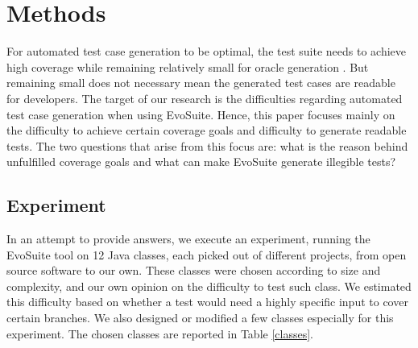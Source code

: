 \section{Methods} \label{methods}

For automated test case generation to be optimal, the test suite needs to achieve high coverage while remaining relatively small for oracle generation \cite{FRASER2013}.
But remaining small does not necessary mean the generated test cases are readable for developers.
The target of our research is the difficulties regarding automated test case generation when using EvoSuite. 
Hence, this paper focuses mainly on the difficulty to achieve certain coverage goals and difficulty to generate readable tests. 
The two questions that arise from this focus are: what is the reason behind unfulfilled coverage goals and what can make EvoSuite generate illegible tests?

\subsection{Experiment}

In an attempt to provide answers, we execute an experiment, running the EvoSuite tool on 12 Java classes, each picked out of different projects, from open source software to our own. 
These classes were chosen according to size and complexity, and our own opinion on the difficulty to test such class. 
We estimated this difficulty based on whether a test would need a highly specific input to cover certain branches. 
We also designed or modified a few classes especially for this experiment.
The chosen classes are reported in Table \ref{classes}. 

